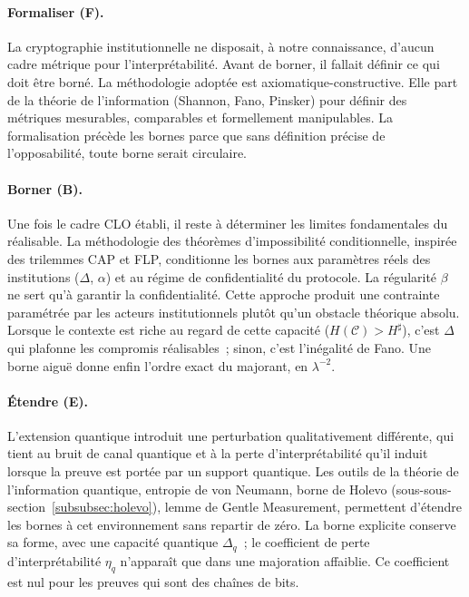 \begin{sloppypar}
\paragraph{Formaliser (\textbf{F}).}
La cryptographie institutionnelle ne disposait, \`a notre connaissance, d'aucun cadre m\'etrique
pour l'interpr\'etabilit\'e. Avant de borner, il fallait d\'efinir ce
qui doit \^etre born\'e. La m\'ethodologie adopt\'ee est
axiomatique-constructive. Elle part de la th\'eorie de l'information
(Shannon, Fano, Pinsker) pour d\'efinir des m\'etriques mesurables,
comparables et formellement manipulables. La formalisation pr\'ec\`ede
les bornes parce que sans d\'efinition pr\'ecise de l'opposabilit\'e,
toute borne serait circulaire.

\paragraph{Borner (\textbf{B}).}
Une fois le cadre CLO \'etabli, il reste \`a d\'eterminer les limites
fondamentales du r\'ealisable. La m\'ethodologie des
th\'eor\`emes d'impossibilit\'e conditionnelle, inspir\'ee des trilemmes
CAP et FLP, conditionne les bornes aux param\`etres r\'eels des
institutions ($\Delta$, $\alpha$) et au r\'egime de confidentialit\'e du protocole. La
r\'egularit\'e $\beta$ ne sert qu'\`a garantir la confidentialit\'e. Cette approche produit une
contrainte param\'etr\'ee par les acteurs institutionnels plut\^ot qu'un
obstacle th\'eorique absolu. Lorsque le contexte est riche au regard de cette capacit\'e
($H(\mathcal{C}) > H^\sharp$), c'est $\Delta$ qui plafonne les compromis
r\'ealisables~; sinon, c'est l'in\'egalit\'e de Fano. Une borne aigu\"e donne enfin
l'ordre exact du majorant, en $\lambda^{-2}$.

\paragraph{\'Etendre (\textbf{E}).}
L'extension quantique introduit une perturbation qualitativement
diff\'erente, qui tient au bruit de canal quantique et \`a la perte
d'interpr\'etabilit\'e qu'il induit lorsque la preuve est port\'ee par un support quantique. Les outils de la th\'eorie
de l'information quantique, entropie de von Neumann, borne de Holevo (sous-sous-section~\ref{subsubsec:holevo}),
lemme de Gentle Measurement, permettent d'\'etendre les bornes \`a cet
environnement sans repartir de z\'ero. La borne explicite conserve sa forme,
avec une capacit\'e quantique $\Delta_q$~; le coefficient de perte
d'interpr\'etabilit\'e $\eta_q$ n'appara\^it que dans une majoration
affaiblie. Ce coefficient est nul pour les preuves qui sont des cha\^ines de bits.
\end{sloppypar}
